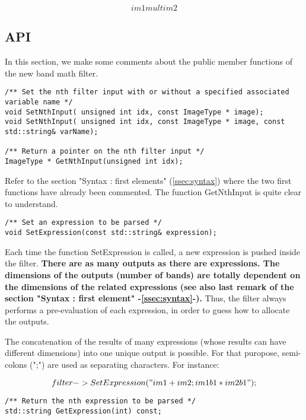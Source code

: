 \begin{equation}
	im1  mult  im2
\end{equation}



\subsection{API}\label{ssec:API}

In this section, we make some comments about the public member functions of the new band math filter.

\begin{verbatim}
/** Set the nth filter input with or without a specified associated variable name */
void SetNthInput( unsigned int idx, const ImageType * image);
void SetNthInput( unsigned int idx, const ImageType * image, const std::string& varName);

/** Return a pointer on the nth filter input */
ImageType * GetNthInput(unsigned int idx);
\end{verbatim}

Refer to the section "Syntax : first elements" (\ref{ssec:syntax}) where the two first functions have already been commented. The function GetNthInput is quite clear to understand.

\begin{verbatim}
/** Set an expression to be parsed */
void SetExpression(const std::string& expression);
\end{verbatim}

Each time the function  SetExpression is called, a new expression is pushed inside the filter. \textbf{There are as many outputs as there are expressions. The dimensions of the outputs (number of bands) are totally dependent on the dimensions of the related expressions (see also last remark of the section "Syntax : first element" -\ref{ssec:syntax}-).} Thus, the filter always performs a pre-evaluation of each expression, in order to guess how to allocate the outputs.

The concatenation of the results of many expressions (whose results can have different dimensions) into one unique output is possible. For that puropose, semi-colons (";") are used as separating characters. For instance:


\begin{equation}
	filter->SetExpression("im1 + im2 ; im1b1*im2b1");
\end{equation}


\begin{verbatim}
/** Return the nth expression to be parsed */
std::string GetExpression(int) const;
\end{verbatim}

